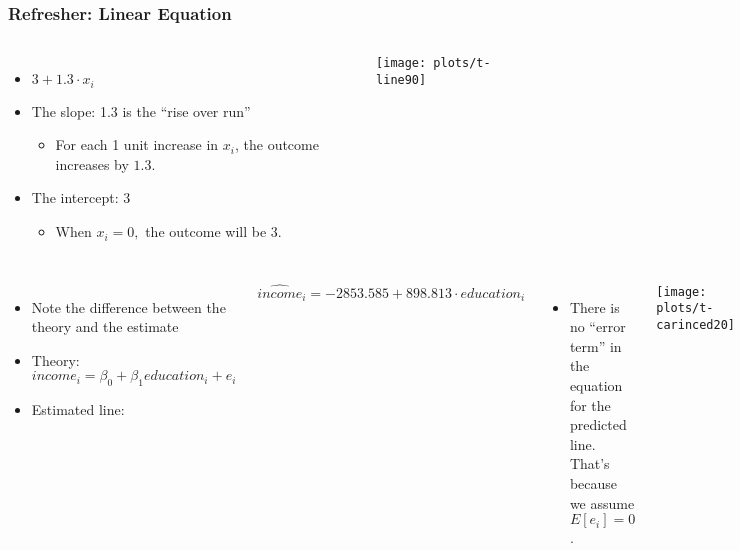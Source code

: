 \documentclass[10pt,english]{beamer}
\def\lyxframeend{} %
\newenvironment{topcolumns}{\begin{columns}[t]}{\end{columns}}
\begin{document}
\begin{frame}[containsverbatim]
\frametitle{Refresher: Linear Equation}
\begin{topcolumns}%


\column{5cm}
\begin{itemize}
\item \textrm{$3+1.3\cdot x_{i}$}
\item The slope: 1.3 is the ``rise over run''

\begin{itemize}
\item For each 1 unit increase in $x_{i}$, the outcome increases by $1.3$.
\end{itemize}
\item The intercept: 3

\begin{itemize}
\item When $x_{i}=0,$ the outcome will be $3$.
\end{itemize}
\end{itemize}

\column{7cm}




\texttt{[image: plots/t-line90]}

\end{topcolumns}%
\end{frame}


\lyxframeend{}
\begin{columns}%


\column{6cm}
\begin{itemize}
\item Note the difference between the theory and the estimate
\item Theory: $income_{i}=\beta_{0}+\beta_{1}education_{i}+e_{i}$
\item Estimated line: 
\end{itemize}

\begin{equation}
\widehat{income}_{i}=-2853.585+898.813\cdot education_{i}
\end{equation}

\begin{itemize}
\item There is no ``error term'' in the equation for the predicted line.
That's because we assume $E[e_{i}]=0$. 
\end{itemize}

\column{6cm}


\texttt{[image: plots/t-carinced20]}

\end{columns}%
\end{document}
